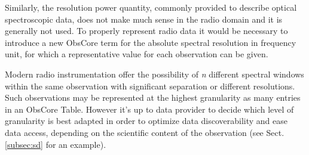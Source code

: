 \documentclass[11pt,a4paper]{ivoa}
\begin{document}
Similarly, the resolution power quantity, commonly provided to describe optical spectroscopic data, does not make much sense in the radio domain and it is generally not used.
To properly represent radio data it would be necessary to introduce a new ObsCore term for the absolute spectral resolution in frequency unit, for which a representative value for each observation can be given. 


Modern radio instrumentation offer the possibility of {\it n} different spectral windows within the same observation with significant separation or different resolutions.
Such observations may be represented at the highest granularity as many entries in an ObsCore Table. However it's up to data provider to decide which level of granularity is best adapted in order to optimize data discoverability and ease data access, depending on the scientific content of the observation (see Sect. \ref{subsec:sd} for an example).


\end{document}
